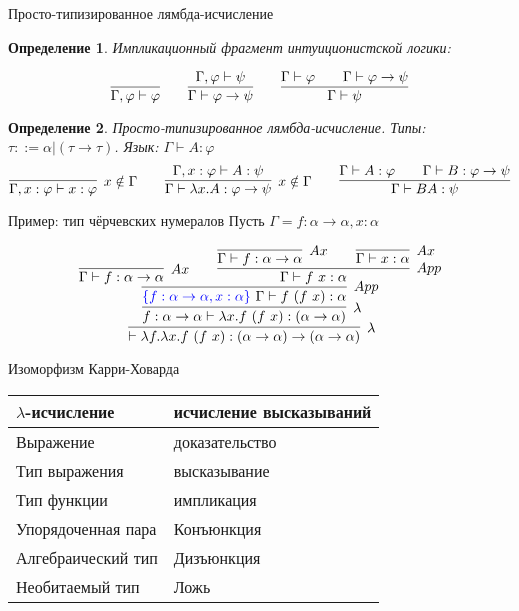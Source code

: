 \documentclass[aspectratio=169]{beamer}
\newtheorem{dfn}{Определение}[section]
\begin{document}
\begin{frame}{Просто-типизированное лямбда-исчисление}
\begin{dfn}Импликационный фрагмент интуиционистской логики:

$$\infer{\Gamma,\varphi \vdash \varphi}{} \quad\quad 
  \infer{\Gamma\vdash\varphi\rightarrow\psi}{\Gamma,\varphi\vdash\psi} \quad\quad 
  \infer{\Gamma\vdash\psi}{\Gamma\vdash\varphi\quad\quad\Gamma\vdash\varphi\rightarrow\psi}$$
\end{dfn}

\begin{dfn}
Просто-типизированное лямбда-исчисление. \pause Типы: $\tau ::= \alpha | (\tau\rightarrow\tau)$. \pause Язык: $\Gamma\vdash A:\varphi$
$$\infer[x \notin \Gamma]{\Gamma,x:\varphi \vdash x:\varphi}{} \quad\quad 
  \infer[x \notin \Gamma]{\Gamma\vdash \lambda x.A: \varphi\rightarrow\psi}{\Gamma,x:\varphi\vdash A:\psi} \quad\quad 
  \infer{\Gamma\vdash B A:\psi}{\Gamma\vdash A:\varphi\quad\quad\Gamma\vdash B:\varphi\rightarrow\psi}$$
\end{dfn}
\end{frame}

\begin{frame}{Пример: тип чёрчевских нумералов}
Пусть $\Gamma = f:\alpha\rightarrow\alpha, x: \alpha$

$$\infer[\lambda]{\vdash \lambda f.\lambda x.f\ (f\ x) : (\alpha\rightarrow\alpha)\rightarrow(\alpha\rightarrow\alpha)}{
  \infer[\lambda]{f: \alpha\rightarrow\alpha \vdash \lambda x.f\ (f\ x) : (\alpha\rightarrow\alpha)}{
    \infer[App]{{\color{blue}\{ f:\alpha\rightarrow\alpha, x: \alpha\}\ }\Gamma \vdash f\ (f\ x): \alpha}{
      \infer[Ax]{\Gamma \vdash f: \alpha\rightarrow\alpha}{}\quad\quad
      \infer[App]{\Gamma \vdash f\ x: \alpha}{
        \infer[Ax]{\Gamma \vdash f: \alpha\rightarrow\alpha}{}\quad\quad\infer[Ax]{\Gamma \vdash x: \alpha}{}
      }
    }
  }
}$$
\end{frame}

\begin{frame}{Изоморфизм Карри-Ховарда}

\begin{tabular}{ll}
$\lambda$-исчисление & исчисление высказываний\\\hline
Выражение & доказательство\\
Тип выражения & высказывание\\
Тип функции & импликация\\
Упорядоченная пара & Конъюнкция\\
Алгебраический тип & Дизъюнкция\\
Необитаемый тип & Ложь
\end{tabular}

\end{frame}
\end{document}

